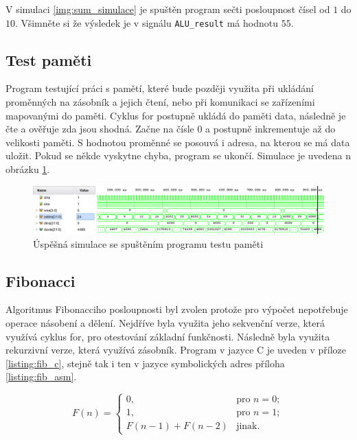 \documentclass[FM,BP]{tulthesis}
\begin{document}
V simulaci \ref{img:sum_simulace} je spuštěn program sečti posloupnost čísel od $1$ do $10$.
Všimněte si že výsledek je v signálu \verb|ALU_result| má hodnotu $55$.

\subsection{Test paměti}
Program testující práci s pamětí, které bude později využita při ukládání proměnných na zásobník a jejich čtení, nebo při komunikaci se zařízeními mapovanými do paměti. Cyklus for postupně ukládá do paměti data, následně je čte a ověřuje zda jsou shodná. Začne na čísle 0 a postupně inkrementuje až do velikosti paměti. S hodnotou proměnné se posouvá i adresa, na kterou se má data uložit. Pokud se někde vyskytne chyba, program se ukončí. Simulace je uvedena n obrázku \ref{img:mem_test_simulace}.

\begin{figure}[h]
    \centering
    \includegraphics[width=\textwidth]{assets/Program_mem_test.png}
    \caption{Úspěšná simulace se spuštěním programu testu paměti}
    \label{img:mem_test_simulace}
\end{figure}

\subsection{Fibonacci}
Algoritmus Fibonacciho posloupnosti byl zvolen protože pro výpočet nepotřebuje operace násobení a dělení. Nejdříve byla využita jeho sekvenční verze, která využívá cyklus for, pro otestování základní funkčnosti. Následně byla využita rekurzivní verze, která využívá zásobník. Program v jazyce C je uveden v příloze \ref{listing:fib_c}, stejně tak i ten v jazyce symbolických adres příloha \ref{listing:fib_asm}. 

\begin{equation}
F(n) = 
\begin{cases}
0, & \text{pro } n = 0; \\
1, & \text{pro } n = 1; \\
F(n−1)+F(n−2) & \text{jinak.}
\end{cases}
\end{equation}
\end{document}
